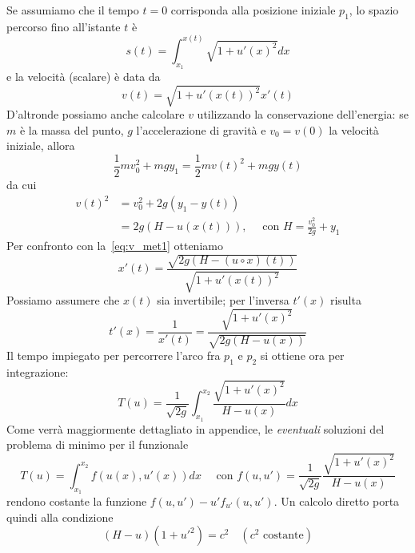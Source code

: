 \begin{example}[Brachistocrona]
    Se assumiamo che il tempo \(t=0\) corrisponda alla posizione iniziale
    \(p_{1}\), lo spazio percorso fino all'istante \(t\) è
    \[
        s{(t)} = \int_{x_{1}}^{x{(t)}}\sqrt{1 + u'{(x)}^2}dx
    \]
    e la velocità (scalare) è data da
    \begin{equation}\label{eq:v_met1}
        v{(t)} = \sqrt{1 + u'{{(x{(t)})}^2} } x'{(t)}
    \end{equation}
    D'altronde possiamo anche calcolare \(v\) utilizzando la conservazione
    dell'energia: se \(m\) è la massa del punto, \(g\) l'accelerazione di
    gravità e \(v_{0} = v{(0)}\) la velocità iniziale, allora
    \[
        \frac{1}{2} m v_{0}^2 + mgy_{1} = \frac{1}{2} m v{(t)}^2 + mgy{(t)}
    \]
    da cui
    \begin{align*}
        v{(t)}^2 &= v_{0}^2 + 2g(y_{1} - y{(t)}) \\
         &= 2g{(H - u{(x{(t)})})}, \quad \text{ con } H = \frac{v_{0}^2}{2g} +
         y_{1}
    \end{align*}
    Per confronto con la~\eqref{eq:v_met1} otteniamo 
    \[
      x'{(t)} = \frac{\sqrt{2g{{\left( H - {(u \circ x)}{(t)}
      \right)}}}}{\sqrt{1 + u'{(x{(t)})^2}}}
    \]
    Possiamo assumere che \(x{(t)}\) sia invertibile; per l'inversa \(t'{(x)}\)
    risulta
    \[
        t'{(x)} = \frac{1}{x'{(t)}} = \frac{\sqrt{1 + u'{{(x)}^2}}}{\sqrt{2g{(H -
        u{(x)})}}}
    \]
    Il tempo impiegato per percorrere l'arco fra \(p_{1}\) e \(p_{2}\) si
    ottiene ora per integrazione:
    \[
        T{(u)} = \frac{1}{\sqrt{2g}} \int_{x_{1}}^{x_{2}} \frac{\sqrt{1 +
        {u'{(x)}}^2}}{H - u{(x)}} dx
    \]
    Come verrà maggiormente dettagliato in appendice, le \emph{eventuali}
    soluzioni del problema di minimo per il funzionale 
    \[
      T{(u)} = \int_{x_{1}}^{x_{2}} f{(u{(x)}, u'{(x)})} dx \quad \text{  con  } f{(u,
      u')} = \frac{1}{\sqrt{2g}} \frac{\sqrt{1+ {u'{(x)}}^2}}{H - u{(x)}}
    \]
    rendono costante la funzione \(f{(u, u')} - u'f_{u'} {(u, u')}\). Un calcolo
    diretto porta quindi alla condizione
    \begin{equation}\label{eq:brachistocrona_diff}
      {(H - u)}{(1 + u'^2)} = c^2 \quad (\text{\(c^2\) costante})
    \end{equation}
\end{example}
